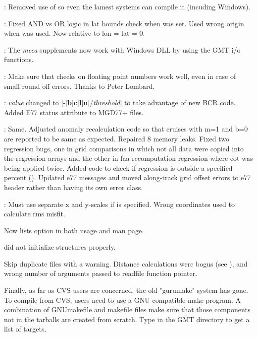 \begin{description}
\item []: Removed use of  so even the lamest systems can compile it (incuding
Windows).
\item []: Fixed AND vs OR logic in lat bounds check when  was set.
Used wrong origin when  was used.  Now relative to lon = lat = 0.
\item [DLL]: The \emph{meca} supplements now work with Windows DLL by using the GMT i/o functions.
\item []: Make sure that checks on floating point numbers work well, even
in case of small round off errors. Thanks to Peter Lombard.
\item []: \emph{value} changed to [-]\textbf{b$|$c$|$l$|$n}[/\emph{threshold}] to
take advantage of new BCR code.  Added E77 status attribute to MGD77+ files.
\item []: Same.  Adjusted anomaly recalculation code so that
cruises with m=1 and b=0 are reported to be same as expected.  Repaired 8 memory leaks. Fixed
two regression bugs, one in grid comparisons in which not all data were copied into the regression
arrays and the other in faa recomputation regression where eot was being applied twice.
Added code to check if regression is outside a specified percent ().
Updated e77 messages and moved along-track grid offset errors to e77 header rather than having its own error class.
\item []: Must use separate x and y-scales if  is specified.
Wrong coordinates used to calculate rms misfit.
\item {} Now lists option  in both usage and man page.
\item {}  did not initialize structures properly.
\item {} Skip duplicate files with a warning. Distance calculations
were bogus (see ), and wrong number of arguments passed to readfile function pointer.
\end{description}

Finally, as far as CVS users are concerned, the old "gurumake" system has gone. To compile from CVS, users need to use a GNU
compatible make program. A combination of GNUmakefile and makefile files make sure that those components not in the
tarballs are created from scratch. Type  in the GMT directory to get a list of targets.

